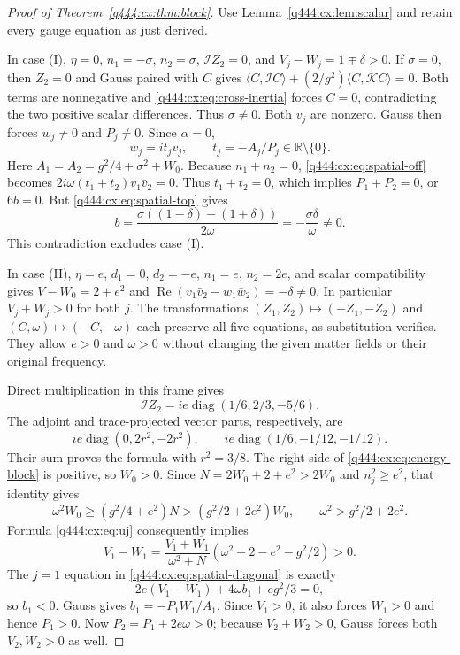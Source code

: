 \begin{proof}[Proof of Theorem~\ref{q444:cx:thm:block}]
Use Lemma~\ref{q444:cx:lem:scalar} and retain every gauge equation as just derived.

In case (I), $\eta=0$, $n_1=-\sigma$, $n_2=\sigma$,
$\mathcal IZ_2=0$, and $V_j-W_j=1\mp\delta>0$.
If $\sigma=0$, then $Z_2=0$ and Gauss paired with $C$ gives
$\langle C,\mathcal IC\rangle+(2/g^2)\langle C,\mathcal KC\rangle=0$.
Both terms are nonnegative and \eqref{q444:cx:eq:cross-inertia} forces $C=0$,
contradicting the two positive scalar differences. Thus $\sigma\ne0$.
Both $v_j$ are nonzero. Gauss then forces $w_j\ne0$ and $P_j\ne0$.
Since $\alpha=0$,
\[
 w_j=i t_jv_j,\qquad t_j=-A_j/P_j\in\mathbb R\setminus\{0\}.
\]
Here $A_1=A_2=g^2/4+\sigma^2+W_0$.
Because $n_1+n_2=0$, \eqref{q444:cx:eq:spatial-off} becomes
$2i\omega(t_1+t_2)v_1\bar v_2=0$.
Thus $t_1+t_2=0$, which implies $P_1+P_2=0$, or $6b=0$.
But \eqref{q444:cx:eq:spatial-top} gives
\[
 b=\frac{\sigma((1-\delta)-(1+\delta))}{2\omega}
   =-\frac{\sigma\delta}{\omega}\ne0.
\]
This contradiction excludes case (I).

In case (II), $\eta=e$, $d_1=0$, $d_2=-e$,
$n_1=e$, $n_2=2e$, and scalar compatibility gives
$V-W_0=2+e^2$ and
$\operatorname{Re}(v_1\bar v_2-w_1\bar w_2)=-\delta\ne0$.
In particular $V_j+W_j>0$ for both $j$.
The transformations $(Z_1,Z_2)\mapsto(-Z_1,-Z_2)$ and
$(C,\omega)\mapsto(-C,-\omega)$ each preserve all five equations,
as substitution verifies. They allow $e>0$ and $\omega>0$ without
changing the given matter fields or their original frequency.

Direct multiplication in this frame gives
\[
 \mathcal IZ_2=ie\operatorname{diag}(1/6,2/3,-5/6).
\]
The adjoint and trace-projected vector parts, respectively, are
\[
 ie\operatorname{diag}(0,2r^2,-2r^2),\qquad
 ie\operatorname{diag}(1/6,-1/12,-1/12).
\]
Their sum proves the formula with $r^2=3/8$.
The right side of \eqref{q444:cx:eq:energy-block} is positive, so $W_0>0$.
Since $N=2W_0+2+e^2>2W_0$ and $n_j^2\geq e^2$, that identity gives
\[
 \omega^2W_0\geq(g^2/4+e^2)N
             >(g^2/2+2e^2)W_0,
 \qquad \omega^2>g^2/2+2e^2.
\]
Formula \eqref{q444:cx:eq:uj} consequently implies
\[
 V_1-W_1=
 \frac{V_1+W_1}{\omega^2+N}
       (\omega^2+2-e^2-g^2/2)>0.
\]
The $j=1$ equation in \eqref{q444:cx:eq:spatial-diagonal} is exactly
\[
 2e(V_1-W_1)+4\omega b_1+eg^2/3=0,
\]
so $b_1<0$. Gauss gives $b_1=-P_1W_1/A_1$.
Since $V_1>0$, it also forces $W_1>0$ and hence $P_1>0$.
Now $P_2=P_1+2e\omega>0$; because $V_2+W_2>0$, Gauss forces
both $V_2,W_2>0$ as well.


\end{proof}
